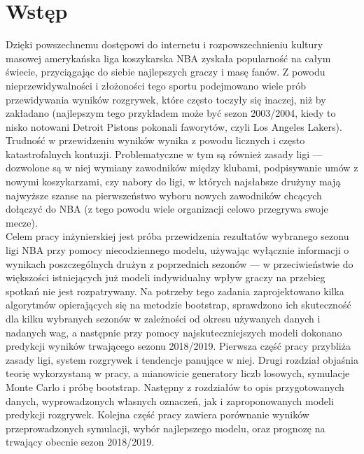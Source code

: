 \documentclass[inzynierska]{pwr_wmat_praca_dyplomowa}
\theoremstyle{plain}
\numberwithin{theorem}{chapter}
\theoremstyle{definition}
\numberwithin{theorem}{chapter}
\begin{document}
\frontmatter
\maketitle
\mainmatter
\tableofcontents

{\backmatter \chapter{Wstęp}}
Dzięki powszechnemu dostępowi do internetu i rozpowszechnieniu kultury masowej amerykańska liga koszykarska NBA zyskała popularność na całym świecie, przyciągając do siebie najlepszych graczy i masę fanów. Z powodu nieprzewidywalności i złożoności tego sportu podejmowano wiele prób przewidywania wyników rozgrywek, które często toczyły się inaczej, niż by zakładano (najlepszym tego przykładem może być sezon 2003/2004, kiedy to nisko notowani Detroit Pistons pokonali faworytów, czyli Los Angeles Lakers). Trudność w przewidzeniu wyników wynika z powodu licznych i często katastrofalnych kontuzji. Problematyczne w tym są również zasady ligi --- dozwolone są w niej wymiany zawodników między klubami, podpisywanie umów z nowymi koszykarzami, czy nabory do ligi, w których najsłabsze drużyny mają najwyższe szanse na pierwszeństwo wyboru nowych zawodników chcących dołączyć do NBA (z tego powodu wiele organizacji celowo przegrywa swoje mecze). \\
\hspace*{6mm}Celem pracy inżynierskiej jest próba przewidzenia rezultatów wybranego sezonu ligi NBA przy pomocy niecodziennego modelu, używając wyłącznie informacji o wynikach poszczególnych drużyn z poprzednich sezonów --- w przeciwieństwie do większości istniejących już modeli indywidualny wpływ graczy na przebieg spotkań nie jest rozpatrywany. Na potrzeby tego zadania zaprojektowano kilka algorytmów opierających się na metodzie bootstrap, sprawdzono ich skuteczność dla kilku wybranych sezonów w zależności od okresu używanych danych i nadanych wag, a następnie przy pomocy najskuteczniejszych modeli dokonano predykcji wyników trwającego sezonu 2018/2019. Pierwsza część pracy przybliża zasady ligi, system rozgrywek i tendencje panujące w niej. Drugi rozdział objaśnia teorię wykorzystaną w pracy, a mianowicie generatory liczb losowych, symulacje Monte Carlo i próbę bootstrap. Następny z rozdziałów to opis przygotowanych danych, wyprowadzonych własnych oznaczeń, jak i zaproponowanych modeli predykcji rozgrywek. Kolejna część pracy zawiera porównanie wyników przeprowadzonych symulacji, wybór najlepszego modelu, oraz prognozę na trwający obecnie sezon 2018/2019. \\
\end{document}
